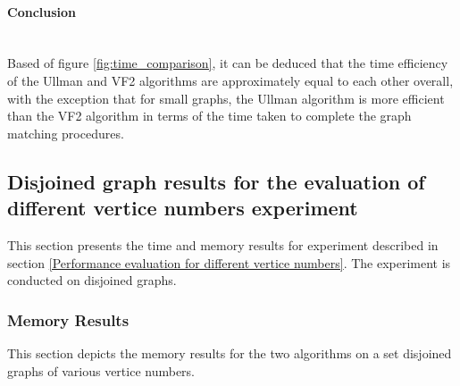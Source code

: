 \paragraph{Conclusion}\mbox{}\\
Based of figure \ref{fig:time_comparison}, it can be deduced that the time efficiency of the Ullman and VF2 algorithms are approximately equal to each other overall,
with the exception that for small graphs, the Ullman algorithm is more efficient than the VF2 algorithm in terms of the time taken to complete the graph matching
procedures.

\newpage

\subsection{Disjoined graph results for the evaluation of different vertice numbers experiment}
This section presents the time and memory results for experiment described in section \ref{Performance evaluation for different vertice numbers}. The 
experiment is conducted on disjoined graphs.
\subsubsection{Memory Results}
This section depicts the memory results for the two algorithms on a set disjoined graphs of various vertice numbers.